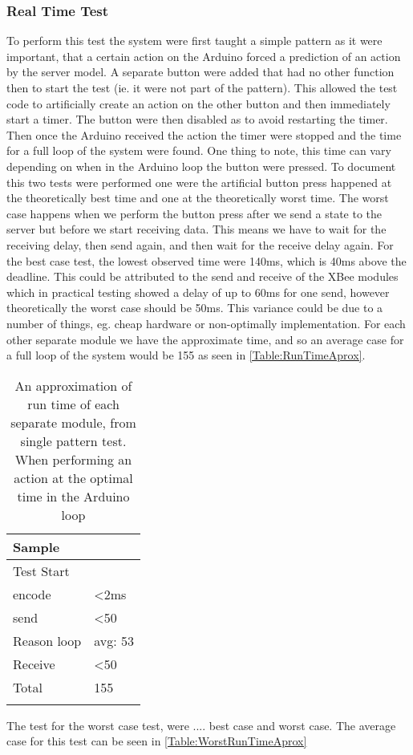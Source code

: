 \subsubsection{Real Time Test}
To perform this test the system were first taught a simple pattern as it were important, that a certain action on the Arduino forced a prediction of an action by the server model. A separate button were added that had no other function then to start the test (ie. it were not part of the pattern). This allowed the test code to artificially create an action on the other button and then immediately start a timer. The button were then disabled as to avoid restarting the timer. Then once the Arduino received the action the timer were stopped and the time for a full loop of the system were found. One thing to note, this time can vary depending on when in the Arduino loop the button were pressed. To document this two tests were performed one were the artificial button press happened at the theoretically best time and one at the theoretically worst time. The worst case happens when we perform the button press after we send a state to the server but before we start receiving data. This means we have to wait for the receiving delay, then send again, and then wait for the receive delay again. For the best case test, the lowest observed time were 140ms, which is 40ms above the deadline. This could be attributed to the send and receive of the XBee modules which in practical testing showed a delay of up to 60ms for one send, however theoretically the worst case should be 50ms\cite{xbee_latency}. This variance could be due to a number of things, eg. cheap hardware or non-optimally implementation. For each other separate module we have the approximate time, and so an average case for a full loop of the system would be 155 as seen in \cref{Table:RunTimeAprox}.
\begin{center}
	\begin{table}[htbp]
	  \centering
	  \begin{tabular}{l | l}
		\toprule
		Sample  		& 			\\ \midrule
		Test Start		&     \\
		encode 			& <2ms  	\\
		send   			& <50  		\\
		Reason loop 	& avg: 53 	\\
		Receive 		& <50  		\\
		Total			& 155		\\
									\\ \bottomrule
	  \end{tabular}
	  \caption[Single pattern test, best case]{An approximation of run time of each separate module, from single pattern test. When performing an action at the optimal time in the Arduino loop}
	\end{table}
 \label{Table:RunTimeAprox}
\end{center}
The test for the worst case test, were .... best case and worst case.
The average case for this test can be seen in \cref{Table:WorstRunTimeAprox}

